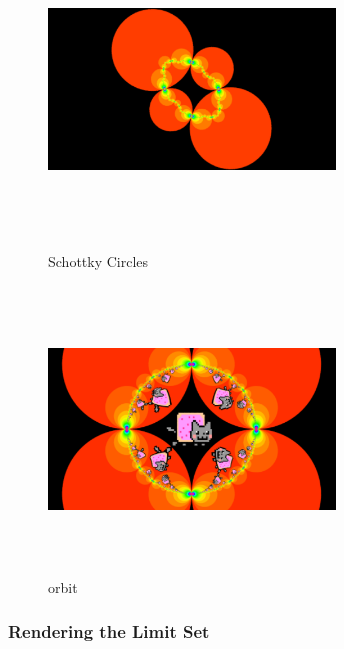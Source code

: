 \begin{figure}[htbp]
 \begin{minipage}{0.49\hsize}
  \begin{center}
   \includegraphics[width=3in, height=3in, keepaspectratio]{../img/klein/schottkyCircles.pdf}
   \caption{Schottky Circles}
   \label{fig:schottky}
  \end{center}
 \end{minipage}
 \begin{minipage}{0.49\hsize}
  \begin{center}
   \includegraphics[width=3in, height=3in, keepaspectratio]{../img/klein/circleOrbit.pdf}
   \caption{orbit}
   \label{fig:orbit}
  \end{center}
 \end{minipage}
\end{figure}

\subsubsection{Rendering the Limit Set}


